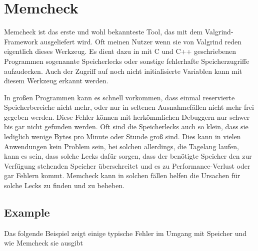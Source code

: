 \section{Memcheck}
Memcheck ist das erste und wohl bekannteste Tool, das mit dem Valgrind-Framework ausgeliefert wird. Oft meinen Nutzer wenn sie von Valgrind reden eigentlich dieses Werkzeug. Es dient dazu in mit C und C++ geschriebenen Programmen sogenannte Speicherlecks oder sonstige fehlerhafte Speicherzugriffe aufzudecken. Auch der Zugriff auf noch nicht initialisierte Variablen kann mit diesem Werkzeug erkannt werden.

In großen Programmen kann es schnell vorkommen, dass einmal reservierte Speicherbereiche nicht mehr, oder nur in seltenen Ausnahmefällen nicht mehr frei gegeben werden. Diese Fehler können mit herkömmlichen Debuggern nur schwer bis gar nicht gefunden werden. Oft sind die Speicherlecks auch so klein, dass sie lediglich wenige Bytes pro Minute oder Stunde groß sind. Dies kann in vielen Anwendungen kein Problem sein, bei solchen allerdings, die Tagelang laufen, kann es sein, dass solche Lecks dafür sorgen, dass der benötigte Speicher den zur Verfügung stehenden Speicher überschreitet und es zu Performance-Verlust oder gar Fehlern kommt. Memcheck kann in solchen fällen helfen die Ursachen für solche Lecks zu finden und zu beheben.

\subsection{Example}
Das folgende Beispiel zeigt einige typische Fehler im Umgang mit Speicher und wie Memcheck sie ausgibt



